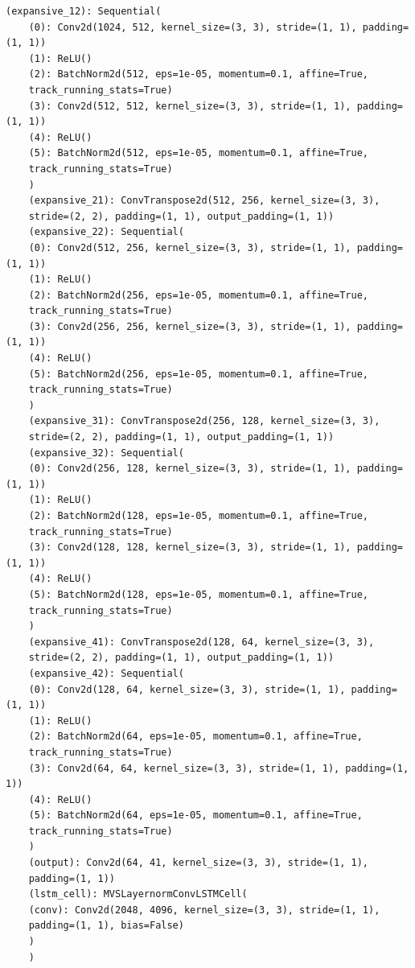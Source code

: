 \begin{lstlisting}[caption={Unet LSTM model architecture description},label=lst:unetlstm]
	(expansive_12): Sequential(
	(0): Conv2d(1024, 512, kernel_size=(3, 3), stride=(1, 1), padding=(1, 1))
	(1): ReLU()
	(2): BatchNorm2d(512, eps=1e-05, momentum=0.1, affine=True, 
	track_running_stats=True)
	(3): Conv2d(512, 512, kernel_size=(3, 3), stride=(1, 1), padding=(1, 1))
	(4): ReLU()
	(5): BatchNorm2d(512, eps=1e-05, momentum=0.1, affine=True, 
	track_running_stats=True)
	)
	(expansive_21): ConvTranspose2d(512, 256, kernel_size=(3, 3), 
	stride=(2, 2), padding=(1, 1), output_padding=(1, 1))
	(expansive_22): Sequential(
	(0): Conv2d(512, 256, kernel_size=(3, 3), stride=(1, 1), padding=(1, 1))
	(1): ReLU()
	(2): BatchNorm2d(256, eps=1e-05, momentum=0.1, affine=True, 
	track_running_stats=True)
	(3): Conv2d(256, 256, kernel_size=(3, 3), stride=(1, 1), padding=(1, 1))
	(4): ReLU()
	(5): BatchNorm2d(256, eps=1e-05, momentum=0.1, affine=True, 
	track_running_stats=True)
	)
	(expansive_31): ConvTranspose2d(256, 128, kernel_size=(3, 3), 
	stride=(2, 2), padding=(1, 1), output_padding=(1, 1))
	(expansive_32): Sequential(
	(0): Conv2d(256, 128, kernel_size=(3, 3), stride=(1, 1), padding=(1, 1))
	(1): ReLU()
	(2): BatchNorm2d(128, eps=1e-05, momentum=0.1, affine=True, 
	track_running_stats=True)
	(3): Conv2d(128, 128, kernel_size=(3, 3), stride=(1, 1), padding=(1, 1))
	(4): ReLU()
	(5): BatchNorm2d(128, eps=1e-05, momentum=0.1, affine=True, 
	track_running_stats=True)
	)
	(expansive_41): ConvTranspose2d(128, 64, kernel_size=(3, 3), 
	stride=(2, 2), padding=(1, 1), output_padding=(1, 1))
	(expansive_42): Sequential(
	(0): Conv2d(128, 64, kernel_size=(3, 3), stride=(1, 1), padding=(1, 1))
	(1): ReLU()
	(2): BatchNorm2d(64, eps=1e-05, momentum=0.1, affine=True, 
	track_running_stats=True)
	(3): Conv2d(64, 64, kernel_size=(3, 3), stride=(1, 1), padding=(1, 1))
	(4): ReLU()
	(5): BatchNorm2d(64, eps=1e-05, momentum=0.1, affine=True, 
	track_running_stats=True)
	)
	(output): Conv2d(64, 41, kernel_size=(3, 3), stride=(1, 1), 
	padding=(1, 1))
	(lstm_cell): MVSLayernormConvLSTMCell(
	(conv): Conv2d(2048, 4096, kernel_size=(3, 3), stride=(1, 1), 
	padding=(1, 1), bias=False)
	)
	)
	
	\end{lstlisting}


